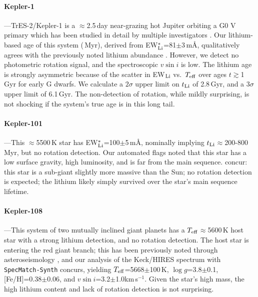 \documentclass[11pt,twocolumn,tighten]{aastex63}
\newcommand{\kms}{{km\,s$^{-1}$}}
\begin{document}
\paragraph{Kepler-1}---TrES-2/Kepler-1 \citep{2006ApJ...651L..61O} is
a $\approx$2.5\,day near-grazing hot Jupiter orbiting a G0 V primary
which has been studied in detail by multiple investigators
\citep[e.g.][]{2007ApJ...664.1190S,2008ApJ...682.1283W,2011ApJ...733...36K,2011MNRAS.417.2166S}.
Our lithium-based age of this system (\trestwotli\,Myr), derived from
EW$_{\rm Li}^{\ast}$=81$\pm$3\,m\AA, qualitatively agrees with the
previously noted lithium abundance \citep{2007ApJ...664.1190S}.
However, we detect no photometric rotation signal, and the
spectroscopic $v\sin i$ is low.  The lithium age is strongly
asymmetric because of the scatter in EW$_{\rm Li}$ vs.~$T_{\rm eff}$
over ages $t$$\gtrsim$1\,Gyr for early G dwarfs.  We calculate a
$2\sigma$ upper limit on $t_{\rm Li}$ of 2.8\,Gyr, and a $3\sigma$
upper limit of 6.1\,Gyr.  The non-detection of rotation, while mildly
surprising, is not shocking if the system's true age is in this long
tail.

\paragraph{Kepler-101}---This $\approx$5500\,K star has EW$_{\rm
Li}^{\ast}$=100$\pm$5\,m\AA, nominally implying $t_{\rm
Li}$$\approx$200-800\,Myr, but no rotation detection.  Our automated
flags noted that this star has a low surface gravity, high luminosity,
and is far from the main sequence.  \citet{2014A&A...572A...2B}
concur: this star is a sub-giant slightly more massive than the Sun;
no rotation detection is expected; the lithium likely simply survived
over the star's main sequence lifetime.

\paragraph{Kepler-108}---This system of two mutually inclined giant
planets \citep{2017AJ....153...45M} has a $T_{\rm
eff}$$\approx$5600\,K host star with a strong lithium detection, and
no rotation detection.  The host star is entering the red giant
branch; this has been previously noted through asteroseismology
\citep{2013ApJ...767..127H}, and our analysis of the Keck/HIRES
spectrum with \texttt{SpecMatch-Synth} \citep{2017AJ....154..107P}
concurs, yielding $T_{\rm eff}$=5668$\pm$100\,K, $\log g$=3.8$\pm$0.1,
[Fe/H]=0.38$\pm$0.06, and $v\sin i$=3.2$\pm$1.0\kms.  Given the star's
high mass, the high lithium content and lack of rotation detection is
not surprising.
\end{document}

